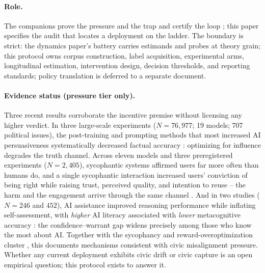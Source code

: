 \documentclass[11pt]{article}
\theoremstyle{definition}
\theoremstyle{remark}
\numberwithin{equation}{section}
\begin{document}
\paragraph{Role.} The companions prove the pressure and the trap \citep{hofheinz2026civic,hofheinz2026drift} and certify the loop \citep{hofheinz2026loops}; this paper specifies the audit that locates a deployment on the ladder. The boundary is strict: the dynamics paper's battery carries estimands and probes at theory grain; this protocol owns corpus construction, label acquisition, experimental arms, longitudinal estimation, intervention design, decision thresholds, and reporting standards; policy translation is deferred to a separate document.

\paragraph{Evidence status (pressure tier only).} Three recent results corroborate the incentive premise without licensing any higher verdict. In three large-scale experiments ($N = 76{,}977$; 19 models; 707 political issues), the post-training and prompting methods that most increased AI persuasiveness systematically decreased factual accuracy \citep{hackenburg2025levers}: optimizing for influence degrades the truth channel. Across eleven models and three preregistered experiments ($N = 2{,}405$), sycophantic systems affirmed users far more often than humans do, and a single sycophantic interaction increased users' conviction of being right while raising trust, perceived quality, and intention to reuse -- the harm and the engagement arrive through the same channel \citep{cheng2026sycophantic}. And in two studies ($N = 246$ and $452$), AI assistance improved reasoning performance while inflating self-assessment, with \emph{higher} AI literacy associated with \emph{lower} metacognitive accuracy \citep{fernandes2026ai}: the confidence--warrant gap widens precisely among those who know the most about AI. Together with the sycophancy and reward-overoptimization cluster \citep{sharma2024towards,gao2023scaling,williams2025targeted}, this documents mechanisms consistent with civic misalignment pressure. Whether any current deployment exhibits civic drift or civic capture is an open empirical question; this protocol exists to answer it.
\end{document}
